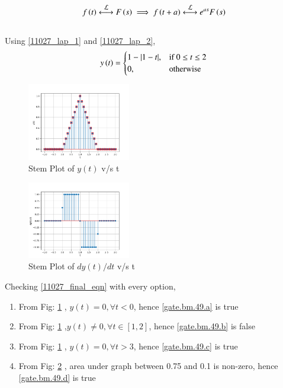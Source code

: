 \documentclass[journal,12pt,twocolumn]{IEEEtran}
\theoremstyle{remark}
\begin{document}
\begin{align}
    f\brak{t} \system{L} F\brak{s}  \implies f\brak{t+a} \system{L} e^{as}F\brak{s} \label{11027_lap_2}
\end{align}\\
Using \eqref{11027_lap_1} and \eqref{11027_lap_2}, 
\begin{align}
y\left(t\right)=
    \begin{cases}
        1-|1-t|, & \text{if } 0\leq t \leq 2\\
        0, & \text{otherwise}
    \end{cases} \label{11027_final_eqn}
\end{align}

\begin{figure}[h]
    \includegraphics[width=0.4\textwidth]{figs/y(t)_vs_t.png}
    \caption{Stem Plot of $y(t)$ v/s t}\label{11027_y(t)_plot}
\end{figure}
\begin{figure}[h]
    \includegraphics[width=0.4\textwidth]{figs/dy_dt_vs_t.png}
    \caption{Stem Plot of $dy(t)/dt$ v/s t}\label{11027_dy_dt_plot}
\end{figure}
Checking \eqref{11027_final_eqn} with every option,\\
\begin{enumerate}[label = (\Alph*)]
	\item From Fig: \ref{11027_y(t)_plot} , $y(t) = 0, \forall t<0$, hence \ref{gate.bm.49.a} is true \\
	\item From Fig: \ref{11027_y(t)_plot} ,$y(t) \neq 0,\forall t \in [1,2]$, hence \ref{gate.bm.49.b} is false \\
	\item From Fig: \ref{11027_y(t)_plot} , $y(t) =0, \forall t>3$, hence \ref{gate.bm.49.c} is true \\
	\item From Fig: \ref{11027_dy_dt_plot} , area under graph between 0.75 and 0.1 is non-zero, hence \ref{gate.bm.49.d} is true \\
\end{enumerate}
\end{document}
